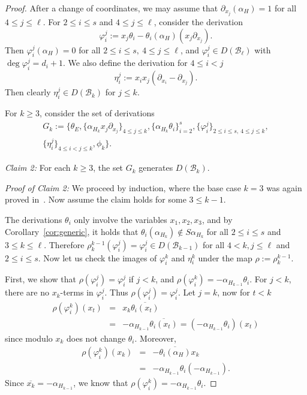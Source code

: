 \documentclass[10pt,a4paper]{amsart}
\def\B{{\mathcal{B}}}%
\begin{document}
\begin{proof}
After a change of coordinates, we may assume that $\partial_{x_j}(\alpha_H)=1$ for all $4\le j \le \ell$.
For $2\le i \le s$ and $4\le j\le \ell$, consider the derivation
$$
\varphi_i^j:=x_j \theta_i-\theta_i(\alpha_H) (x_j \partial_{x_{j}}).
$$
Then $\varphi_i^j(\alpha_H)=0$ for all $ 2 \le i \le s,\ 
4 \le j \le \ell$, and $\varphi_i^j \in D(\B_\ell)$ with $\deg \varphi_i^j=d_i+1$.
We also define the derivation for $4 \le i<j$
$$
\eta_i^j:=x_ix_j(\partial_{x_i}-\partial_{x_j}).
$$
Then clearly $\eta_i^j \in D(\B_k)$ for $j \le k$.

For $k\ge 3$, consider the set of derivations
\begin{multline*}
	G_k := \bigg\{\theta_E,\{\alpha_{H_k} x_j \partial_{x_j}\}_{4\le j \le k}, \{\alpha_{H_k} \theta_i\}_{i=2}^s, 
	\{ \varphi_i^j\}_{2 \le i \le s,\ 4\le j \le k}, \\ \{\eta_i^j\}_{4 \le i<j\le k}, \phi_k \bigg\}.
\end{multline*}

\emph{Claim 2:} For each $k\ge 3$, the set $G_k$ generates $D(\B_k)$.

\emph{Proof of Claim 2:} We proceed by induction, where the base case $k=3$ was again proved in~.
Now assume the claim holds for some $3\le k-1$.

The derivations $\theta_i$ only involve the variables $x_1,x_2,x_3$, and by Corollary~\ref{cor:generic}, it holds that $\theta_i(\alpha_{H_k})\notin S\alpha_{H_k}$ for all $2 \le i \le s$ and $3\le k \le \ell$.
Therefore $\rho_k^{k-1}(\varphi_{i}^j)=\varphi_{i}^j \in D(\B_{k-1})$ for all $4< k, j \le \ell$ and $2 \le i \le s$. Now let us check the images of $\varphi_i^k$ and $\eta_i^k$ under the map $\rho:=\rho_k^{k-1}$.

First, we show that $\rho(\varphi_i^j)=\varphi_i^j$ if $j<k$, and 
$\rho(\varphi_i^k)=-\alpha_{H_{k-1}}\theta_i$.
For $j<k$, there are no $x_k$-terms in $\varphi_i^j$. Thus 
$\rho(\varphi_i^j)=\varphi_i^j$. Let $j=k$, now for $t<k$ 
\begin{eqnarray*}
\rho(\varphi_i^k)(x_t)&=&
x_k \overline{\theta_i(x_t)}\\
&=&-\alpha_{H_{k-1}}\overline{\theta_i(x_t)}=(-\alpha_{H_{k-1}} \theta_i)(x_t)
\end{eqnarray*}
since modulo $x_k$ does not change $\theta_i$. Moreover, 
\begin{eqnarray*}
\rho(\varphi_i^k)(x_k)&=&
-\overline{\theta_i(\alpha_H)} x_k\\
&=&-\alpha_{H_{k-1}}\theta_i(-\alpha_{H_{k-1}}).
\end{eqnarray*}
Since $\overline{x_k}=-\alpha_{H_{k-1}}$, we know that 
$\rho(\varphi_i^k)=-\alpha_{H_{k-1}}\theta_i$.


\end{proof}
\end{document}
